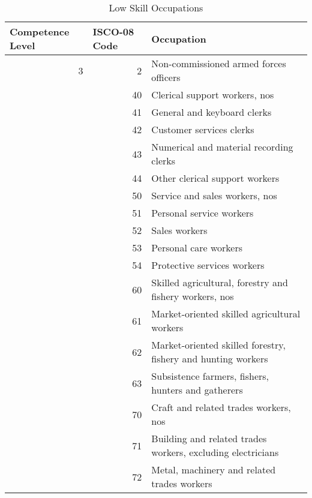\documentclass[]{article}
\begin{document}
\begin{table}[H]
  \centering
  \caption{Low Skill Occupations}
  \begin{tabular}{rrp{20em}}
    \toprule
    \multicolumn{1}{l}{Competence Level} & \multicolumn{1}{l}{ISCO-08 Code} & \multicolumn{1}{l}{Occupation} \\
    \midrule
    3     & 2     & Non-commissioned armed forces officers \\
                                         & 40    & Clerical support workers, nos \\
                                         & 41    & General and keyboard clerks \\
                                         & 42    & Customer services clerks \\
                                         & 43    & Numerical and material recording clerks \\
                                         & 44    & Other clerical support workers \\
                                         & 50    & Service and sales workers, nos \\
                                         & 51    & Personal service workers \\
                                         & 52    & Sales workers \\
                                         & 53    & Personal care workers \\
                                         & 54    & Protective services workers \\
                                         & 60    & Skilled agricultural, forestry and fishery workers, nos \\
                                         & 61    & Market-oriented skilled agricultural workers \\
                                         & 62    & Market-oriented skilled forestry, fishery and hunting workers \\
                                         & 63    & Subsistence farmers, fishers, hunters and gatherers \\
                                         & 70    & Craft and related trades workers, nos \\
                                         & 71    & Building and related trades workers, excluding electricians \\
                                         & 72    & Metal, machinery and related trades workers \\

\end{tabular}
\end{table}
\end{document}
